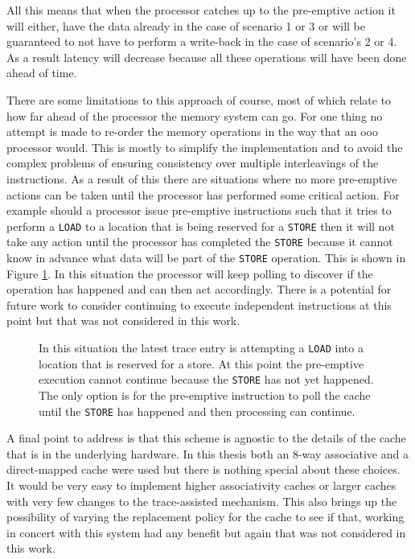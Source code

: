 All this means that when the processor catches up to the pre-emptive action it will either, have the data already in the case of scenario 1 or 3 or will be guaranteed to not have to perform a write-back in the case of scenario's 2 or 4. As a result latency will decrease because all these operations will have been done ahead of time. 

There are some limitations to this approach of course, most of which relate to how far ahead of the processor the memory system can go. For one thing no attempt is made to re-order the memory operations in the way that an \gls{ooo} processor would. This is mostly to simplify the implementation and to avoid the complex problems of ensuring consistency over multiple interleavings of the instructions. As a result of this there are situations where no more pre-emptive actions can be taken until the processor has performed some critical action. For example should a processor issue pre-emptive instructions such that it tries to perform a \texttt{LOAD} to a location that is being reserved for a \texttt{STORE} then it will not take any action until the processor has completed the \texttt{STORE} because it cannot know in advance what data will be part of the \texttt{STORE} operation. This is shown in Figure \ref{fig:problem-scenario}. In this situation the processor will keep polling to discover if the operation has happened and can then act accordingly. There is a potential for future work to consider continuing to execute independent instructions at this point but that was not considered in this work. 

\begin{figure} [htbp]
	\begin{center}
		
		\caption{In this situation the latest trace entry is attempting a \texttt{LOAD} into a location that is reserved for a store. At this point the pre-emptive execution cannot continue because the \texttt{STORE} has not yet happened. The only option is for the pre-emptive instruction to poll the cache until the \texttt{STORE} has happened and then processing can continue.}
		\label{fig:problem-scenario}
	\end{center}
\end{figure}

A final point to address is that this scheme is agnostic to the details of the cache that is in the underlying hardware. In this thesis both an 8-way associative and a direct-mapped cache were used but there is nothing special about these choices. It would be very easy to implement higher associativity caches or larger caches with very few changes to the trace-assisted mechanism. This also brings up the possibility of varying the replacement policy for the cache to see if that, working in concert with this system had any benefit but again that was not considered in this work. 

